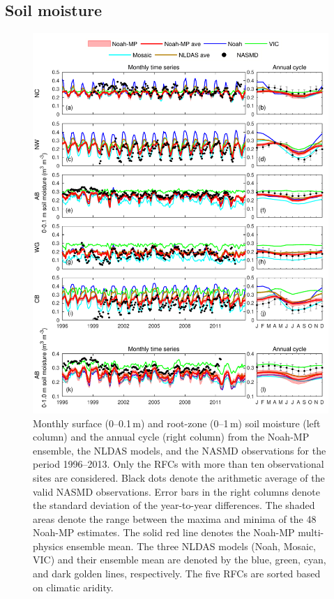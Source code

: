 \documentclass[essd, manuscript]{copernicus}
\begin{document}
\subsection{Soil moisture} \label{sec:results:sm}

\begin{figure}[t]
  \includegraphics[width=14cm]{fig/fig04.pdf}
  \caption{Monthly surface (0--0.1\,m) and root-zone (0--1\,m) soil moisture (left column) and the annual cycle (right column) from the Noah-MP ensemble, the NLDAS models, and the NASMD observations for the period 1996--2013. Only the RFCs with more than ten observational sites are considered. Black dots denote the arithmetic average of the valid NASMD observations. Error bars in the right columns denote the standard deviation of the year-to-year differences. The shaded areas denote the range between the maxima and minima of the 48 Noah-MP estimates. The solid red line denotes the Noah-MP multi-physics ensemble mean. The three NLDAS models (Noah, Mosaic, VIC) and their ensemble mean are denoted by the blue, green, cyan, and dark golden lines, respectively. The five RFCs are sorted based on climatic aridity.}
  \label{fig:sm:ts}
\end{figure}
\end{document}
